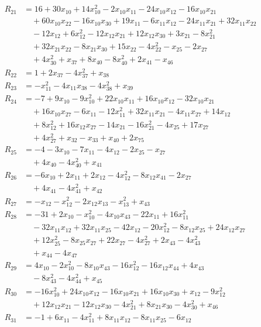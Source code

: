 \begin{align*}
R_{21}&=16+30x_{10}+14x_{10}^{2}-2x_{10}x_{11}-24x_{10}x_{12}-16x_{10}x_{21}\\
&\quad{}+60x_{10}x_{22}-16x_{10}x_{30}+19x_{11}-6x_{11}x_{12}-24x_{11}x_{21}+32x_{11}x_{22}\\
&\quad{}-12x_{12}+6x_{12}^{2}-12x_{12}x_{21}+12x_{12}x_{30}+3x_{21}-8x_{21}^{2}\\
&\quad{}+32x_{21}x_{22}-8x_{21}x_{30}+15x_{22}-4x_{22}^{2}-x_{25}-2x_{27}\\
&\quad{}+4x_{30}^{2}+x_{37}+8x_{40}-8x_{40}^{2}+2x_{41}-x_{46}\\
R_{22}&=1+2x_{37}-4x_{37}^{2}+x_{38}\\
R_{23}&=-x_{11}^{2}-4x_{11}x_{38}-4x_{38}^{2}+x_{39}\\
R_{24}&=-7+9x_{10}-9x_{10}^{2}+22x_{10}x_{11}+16x_{10}x_{12}-32x_{10}x_{21}\\
&\quad{}+16x_{10}x_{27}-6x_{11}-12x_{11}^{2}+32x_{11}x_{21}-4x_{11}x_{27}+14x_{12}\\
&\quad{}+8x_{12}^{2}+16x_{12}x_{27}-14x_{21}-16x_{21}^{2}-4x_{25}+17x_{27}\\
&\quad{}+4x_{27}^{2}+x_{32}-x_{33}+x_{40}+2x_{75}\\
R_{25}&=-4-3x_{10}-7x_{11}-4x_{12}-2x_{25}-x_{27}\\
&\quad{}+4x_{40}-4x_{40}^{2}+x_{41}\\
R_{26}&=-6x_{10}+2x_{11}+2x_{12}-4x_{12}^{2}-8x_{12}x_{41}-2x_{27}\\
&\quad{}+4x_{41}-4x_{41}^{2}+x_{42}\\
R_{27}&=-x_{12}-x_{12}^{2}-2x_{12}x_{13}-x_{13}^{2}+x_{43}\\
R_{28}&=-31+2x_{10}-x_{10}^{2}-4x_{10}x_{43}-22x_{11}+16x_{11}^{2}\\
&\quad{}-32x_{11}x_{12}+32x_{11}x_{25}-42x_{12}-20x_{12}^{2}-8x_{12}x_{25}+24x_{12}x_{27}\\
&\quad{}+12x_{25}^{2}-8x_{25}x_{27}+22x_{27}-4x_{27}^{2}+2x_{43}-4x_{43}^{2}\\
&\quad{}+x_{44}-4x_{47}\\
R_{29}&=4x_{10}-2x_{10}^{2}-8x_{10}x_{43}-16x_{12}^{2}-16x_{12}x_{44}+4x_{43}\\
&\quad{}-8x_{43}^{2}-4x_{44}^{2}+x_{45}\\
R_{30}&=-16x_{10}^{2}+24x_{10}x_{12}-16x_{10}x_{21}+16x_{10}x_{30}+x_{12}-9x_{12}^{2}\\
&\quad{}+12x_{12}x_{21}-12x_{12}x_{30}-4x_{21}^{2}+8x_{21}x_{30}-4x_{30}^{2}+x_{46}\\
R_{31}&=-1+6x_{11}-4x_{11}^{2}+8x_{11}x_{12}-8x_{11}x_{25}-6x_{12}\\

\end{align*}
